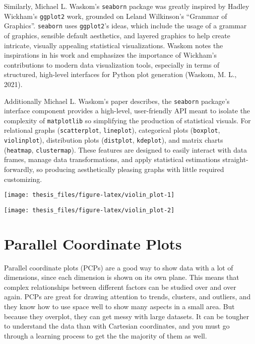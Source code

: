\documentclass[print]{nuthesis}
\begin{document}
Similarly, Michael L. Waskom's \texttt{seaborn} package was greatly inspired by Hadley Wickham's \texttt{ggplot2} work, grounded on Leland Wilkinson's ``Grammar of Graphics''.
\texttt{seaborn} uses \texttt{ggplot2}'s ideas, which include the usage of a grammar of graphics, sensible default aesthetics, and layered graphics to help create intricate, visually appealing statistical visualizations.
Waskom notes the inspirations in his work and emphasizes the importance of Wickham's contributions to modern data visualization tools, especially in terms of structured, high-level interfaces for Python plot generation (Waskom, M. L., 2021).

Additionally Michael L. Waskom's paper describes, the \texttt{seaborn} package's interface component provides a high-level, user-friendly API meant to isolate the complexity of \texttt{matplotlib} so simplifying the production of statistical visuals.
For relational graphs (\texttt{scatterplot}, \texttt{lineplot}), categorical plots (\texttt{boxplot}, \texttt{violinplot}), distribution plots (\texttt{distplot}, \texttt{kdeplot}), and matrix charts (\texttt{heatmap}, \texttt{clustermap}).
These features are designed to easily interact with data frames, manage data transformations, and apply statistical estimations straight-forwardly, so producing aesthetically pleasing graphs with little required customizing.

\begin{center}\texttt{[image: thesis\_files/figure-latex/violin\_plot-1]} \end{center}

\begin{center}\texttt{[image: thesis\_files/figure-latex/violin\_plot-2]} \end{center}

\hypertarget{parallel-coordinate-plots}{%
\section{Parallel Coordinate Plots}\label{parallel-coordinate-plots}}

Parallel coordinate plots (PCPs) are a good way to show data with a lot of dimensions, since each dimension is shown on its own plane.
This means that complex relationships between different factors can be studied over and over again.
PCPs are great for drawing attention to trends, clusters, and outliers, and they know how to use space well to show many aspects in a small area.
But because they overplot, they can get messy with large datasets.
It can be tougher to understand the data than with Cartesian coordinates, and you must go through a learning process to get the the majority of them as well.
\end{document}
